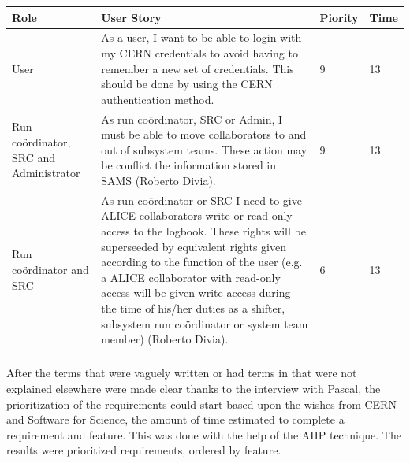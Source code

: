 \documentclass[paper=a4, fontsize=11pt,twoside]{scrartcl}	%
\begin{document}
\begin{longtable}{ | p{3cm} | p{8cm} | p{1cm} | l |}
\hline
Role & User Story & Piority & Time \\ \hline
User & As a user, I want to be able to login with my CERN credentials to avoid having to remember a new set of credentials. This should be done by using the CERN authentication method. & 9 & 13 \\ \hline
Run coördinator, SRC and Administrator &  As run coördinator, SRC or Admin, I must be able to move collaborators to and out of subsystem teams. These action may be conflict the information stored in SAMS (Roberto Divia). & 9 & 13 \\ \hline
Run coördinator and SRC &  As run coördinator or SRC I need to give ALICE collaborators write or read-only access to the logbook. These rights will be superseeded by equivalent rights given according to the function of the user (e.g. a ALICE collaborator with read-only access will be given write access during the time of his/her duties as a shifter, subsystem run coördinator or system team member) (Roberto Divia).&6&13 \\ \hline

\label{table:hans}
\end{longtable}

After the terms that were vaguely written or had terms in that were not explained elsewhere were made clear thanks to the interview with Pascal, the prioritization of the requirements could start based upon the wishes from CERN and Software for Science, the amount of time estimated to complete a requirement and feature. This was done with the help of the AHP technique. The results were prioritized requirements, ordered by feature. 
\newpage
\end{document}
